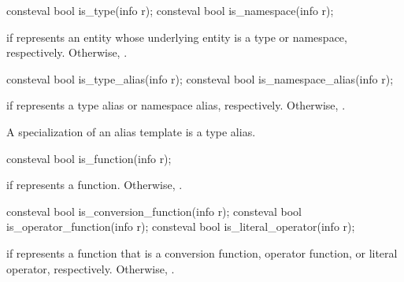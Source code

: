%
%
\begin{itemdecl}
consteval bool is_type(info r);
consteval bool is_namespace(info r);
\end{itemdecl}

\begin{itemdescr}
\pnum
\returns
{} if  represents an entity
whose underlying entity is a type or namespace, respectively.
Otherwise, .
\end{itemdescr}

%
%
\begin{itemdecl}
consteval bool is_type_alias(info r);
consteval bool is_namespace_alias(info r);
\end{itemdecl}

\begin{itemdescr}
\pnum
\returns
{} if  represents a type alias or namespace alias, respectively.
Otherwise, .
\begin{note}
A specialization of an alias template is a type alias.
\end{note}
\end{itemdescr}

%
\begin{itemdecl}
consteval bool is_function(info r);
\end{itemdecl}

\begin{itemdescr}
\pnum
\returns
{} if  represents a function.
Otherwise, .
\end{itemdescr}

%
%
%
\begin{itemdecl}
consteval bool is_conversion_function(info r);
consteval bool is_operator_function(info r);
consteval bool is_literal_operator(info r);
\end{itemdecl}

\begin{itemdescr}
\pnum
\returns
{} if  represents a function that is a
conversion function,
operator function, or
literal operator, respectively.
Otherwise, .
\end{itemdescr}

